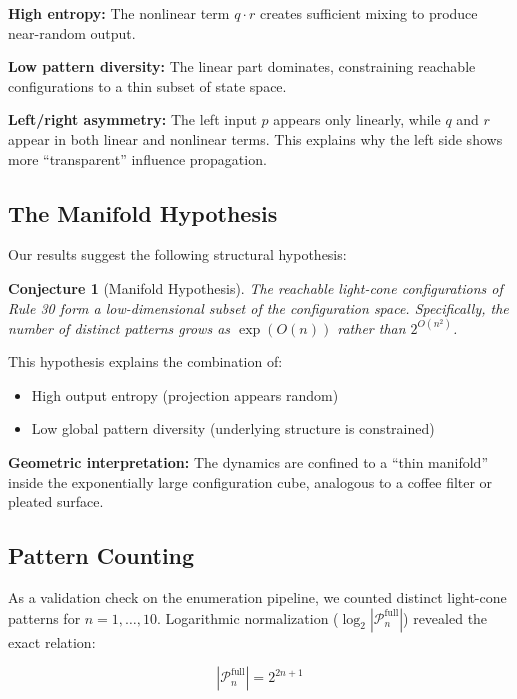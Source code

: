\documentclass[11pt]{article}
\newtheorem{conjecture}[theorem]{Conjecture}
\begin{document}
\textbf{High entropy:} The nonlinear term $q \cdot r$ creates sufficient mixing to produce near-random output.

\textbf{Low pattern diversity:} The linear part dominates, constraining reachable configurations to a thin subset of state space.

\textbf{Left/right asymmetry:} The left input $p$ appears only linearly, while $q$ and $r$ appear in both linear and nonlinear terms. This explains why the left side shows more ``transparent'' influence propagation.

\subsection{The Manifold Hypothesis}

Our results suggest the following structural hypothesis:

\begin{conjecture}[Manifold Hypothesis]
The reachable light-cone configurations of Rule 30 form a low-dimensional subset of the configuration space. Specifically, the number of distinct patterns grows as $\exp(O(n))$ rather than $2^{O(n^2)}$.
\end{conjecture}

This hypothesis explains the combination of:
\begin{itemize}
    \item High output entropy (projection appears random)
    \item Low global pattern diversity (underlying structure is constrained)
\end{itemize}

\textbf{Geometric interpretation:} The dynamics are confined to a ``thin manifold'' inside the exponentially large configuration cube, analogous to a coffee filter or pleated surface.

\subsection{Pattern Counting}

As a validation check on the enumeration pipeline, we counted distinct light-cone patterns for $n=1,\ldots,10$. Logarithmic normalization ($\log_2 |\mathcal{P}_n^{\text{full}}|$) revealed the exact relation:

\begin{equation}
|\mathcal{P}_n^{\text{full}}| = 2^{2n+1}
\end{equation}
\end{document}
